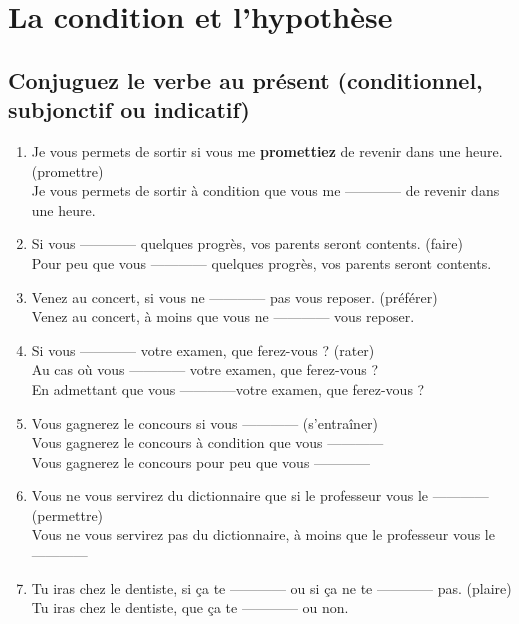 \documentclass[12pt]{article}
\newcommand{\colo}[1]{{\color{blue}\textbf{#1}}}
\begin{document}
\section{La condition et l’hypothèse}
\subsection{Conjuguez le verbe au présent (conditionnel, subjonctif ou indicatif)}
\begin{enumerate}

	\item Je vous permets de sortir si vous me \colo{promettiez} de revenir dans une heure. (promettre) \\
	       Je vous permets de sortir à condition que vous me ------------ de revenir dans une heure.
	\item Si vous ------------ quelques progrès, vos parents seront contents. (faire) \\
	       Pour peu que vous ------------ quelques progrès, vos parents seront contents. \item Venez au concert, si vous ne ------------ pas vous reposer. (préférer) \\
	       Venez au concert, à moins que vous ne ------------ vous reposer.
	\item Si vous ------------ votre examen, que ferez-vous ? (rater) \\
	       Au cas où vous ------------ votre examen, que ferez-vous ? \\  En admettant que vous ------------votre examen, que ferez-vous ? \item Vous gagnerez le concours si vous ------------ (s'entraîner) \\  Vous gagnerez le concours à condition que vous ------------ \\  Vous gagnerez le concours pour peu que vous ------------
	\item Vous ne vous servirez du dictionnaire que si le professeur vous le ------------ (permettre) \\
	       Vous ne vous servirez pas du dictionnaire, à moins que le professeur vous le ------------
	\item Tu iras chez le dentiste, si ça te ------------ ou si ça ne te ------------ pas. (plaire) \\
	       Tu iras chez le dentiste, que ça te ------------ ou non.
\end{enumerate}
\end{document}

